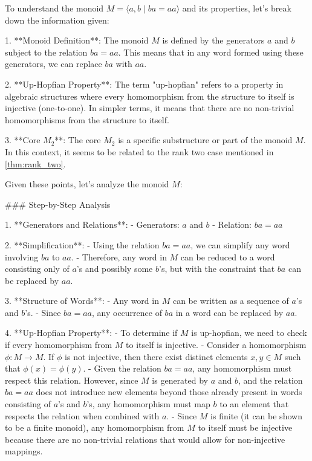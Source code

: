 To understand the monoid \( M = \langle a, b \mid ba = aa \rangle \) and its properties, let's break down the information given:

1. **Monoid Definition**: The monoid \( M \) is defined by the generators \( a \) and \( b \) subject to the relation \( ba = aa \). This means that in any word formed using these generators, we can replace \( ba \) with \( aa \).

2. **Up-Hopfian Property**: The term "up-hopfian" refers to a property in algebraic structures where every homomorphism from the structure to itself is injective (one-to-one). In simpler terms, it means that there are no non-trivial homomorphisms from the structure to itself.

3. **Core \( M_2 \)**: The core \( M_2 \) is a specific substructure or part of the monoid \( M \). In this context, it seems to be related to the rank two case mentioned in \cref{thm:rank_two}.

Given these points, let's analyze the monoid \( M \):

### Step-by-Step Analysis

1. **Generators and Relations**:
   - Generators: \( a \) and \( b \)
   - Relation: \( ba = aa \)

2. **Simplification**:
   - Using the relation \( ba = aa \), we can simplify any word involving \( ba \) to \( aa \).
   - Therefore, any word in \( M \) can be reduced to a word consisting only of \( a \)'s and possibly some \( b \)'s, but with the constraint that \( ba \) can be replaced by \( aa \).

3. **Structure of Words**:
   - Any word in \( M \) can be written as a sequence of \( a \)'s and \( b \)'s.
   - Since \( ba = aa \), any occurrence of \( ba \) in a word can be replaced by \( aa \).

4. **Up-Hopfian Property**:
   - To determine if \( M \) is up-hopfian, we need to check if every homomorphism from \( M \) to itself is injective.
   - Consider a homomorphism \( \phi: M \to M \). If \( \phi \) is not injective, then there exist distinct elements \( x, y \in M \) such that \( \phi(x) = \phi(y) \).
   - Given the relation \( ba = aa \), any homomorphism must respect this relation. However, since \( M \) is generated by \( a \) and \( b \), and the relation \( ba = aa \) does not introduce new elements beyond those already present in words consisting of \( a \)'s and \( b \)'s, any homomorphism must map \( b \) to an element that respects the relation when combined with \( a \).
   - Since \( M \) is finite (it can be shown to be a finite monoid), any homomorphism from \( M \) to itself must be injective because there are no non-trivial relations that would allow for non-injective mappings.

